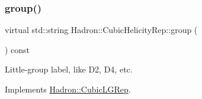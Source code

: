 \subsubsection{\texorpdfstring{group()}{group()}\hspace{0.1cm}{\footnotesize\ttfamily [3/3]}}
{\footnotesize\ttfamily virtual std\+::string Hadron\+::\+Cubic\+Helicity\+Rep\+::group (\begin{DoxyParamCaption}{ }\end{DoxyParamCaption}) const\hspace{0.3cm}{\ttfamily [pure virtual]}}

Little-\/group label, like D2, D4, etc. 

Implements \mbox{\hyperlink{structHadron_1_1CubicLGRep_a9bdb14b519a611d21379ed96a3a9eb41}{Hadron\+::\+Cubic\+L\+G\+Rep}}.



